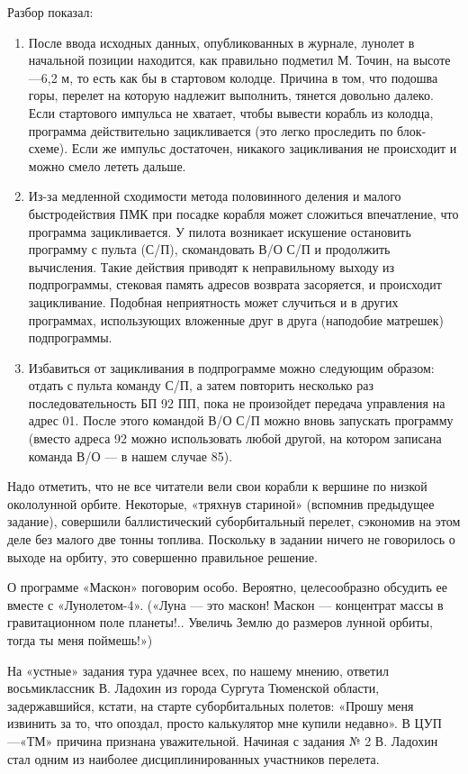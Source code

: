 \documentclass[11pt,a4paper,oneside]{article}
\begin{document}
Разбор показал:
\begin{enumerate}
\item После ввода исходных данных, опубликованных в журнале, лунолет в начальной позиции находится, как правильно подметил М. Точин, на высоте —6,2 м, то есть как бы в стартовом колодце. Причина в том, что подошва горы, перелет на которую надлежит выполнить, тянется довольно далеко. Если стартового импульса не хватает, чтобы вывести корабль из колодца, программа действительно зацикливается (это легко проследить по блок-схеме). Если же импульс достаточен, никакого зацикливания не происходит и можно смело лететь дальше.
\item Из-за медленной сходимости метода половинного деления и малого быстродействия ПМК при посадке корабля может сложиться впечатление, что программа зацикливается. У пилота возникает искушение остановить программу с пульта (С/П), скомандовать В/О С/П и продолжить вычисления. Такие действия приводят к неправильному выходу из подпрограммы, стековая память адресов возврата засоряется, и происходит зацикливание. Подобная неприятность может случиться и в других программах, использующих вложенные друг в друга (наподобие матрешек) подпрограммы.
\item Избавиться от зацикливания в подпрограмме можно следующим образом: отдать с пульта команду С/П, а затем повторить несколько раз последовательность БП 92 ПП, пока не произойдет передача управления на адрес 01. После этого командой В/О С/П можно вновь запускать программу (вместо адреса 92 можно использовать любой другой, на котором записана команда В/О — в нашем случае 85).
\end{enumerate}

Надо отметить, что не все читатели вели свои корабли к вершине по низкой окололунной орбите. Некоторые, «тряхнув стариной» (вспомнив предыдущее задание), совершили баллистический суборбитальный перелет, сэкономив на этом деле без малого две тонны топлива. Поскольку в задании ничего не говорилось о выходе на орбиту, это совершенно правильное решение.

О программе «Маскон» поговорим особо. Вероятно, целесообразно обсудить ее вместе с «Лунолетом-4». («Луна — это маскон! Маскон — концентрат массы в гравитационном поле планеты!.. Увеличь Землю до размеров лунной орбиты, тогда ты меня поймешь!»)

На «устные» задания тура удачнее всех, по нашему мнению, ответил восьмиклассник В. Ладохин из города Сургута Тюменской области, задержавшийся, кстати, на старте суборбитальных полетов: «Прошу меня извинить за то, что опоздал, просто калькулятор мне купили недавно». В ЦУП—«ТМ» причина признана уважительной. Начиная с задания № 2 В. Ладохин стал одним из наиболее дисциплинированных участников перелета.
\end{document}
